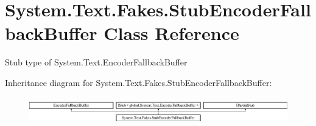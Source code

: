 \hypertarget{class_system_1_1_text_1_1_fakes_1_1_stub_encoder_fallback_buffer}{\section{System.\-Text.\-Fakes.\-Stub\-Encoder\-Fallback\-Buffer Class Reference}
\label{class_system_1_1_text_1_1_fakes_1_1_stub_encoder_fallback_buffer}
}


Stub type of System.\-Text.\-Encoder\-Fallback\-Buffer 


Inheritance diagram for System.\-Text.\-Fakes.\-Stub\-Encoder\-Fallback\-Buffer\-:\begin{figure}[H]
\begin{center}
\leavevmode
\includegraphics[height=1.196581cm]{class_system_1_1_text_1_1_fakes_1_1_stub_encoder_fallback_buffer}
\end{center}
\end{figure}
